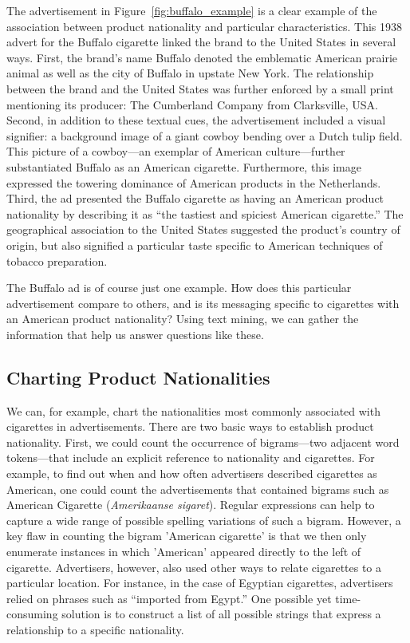 \documentclass[USenglish]{article}
\begin{document}
The advertisement in Figure~\ref{fig:buffalo_example} is a clear example of the association between product nationality and particular characteristics. This  1938 advert for the Buffalo cigarette linked the brand to the United States in several ways. First, the brand's name Buffalo denoted the emblematic American prairie animal as well as the city of Buffalo in upstate New York. The relationship between the brand and the United States was further enforced by a small print mentioning its producer: The Cumberland Company from Clarksville, USA.
%
Second, in addition to these textual cues, the advertisement included a visual signifier: a background image of a giant cowboy bending over a Dutch tulip field. This picture of a cowboy—an exemplar of American culture—further substantiated Buffalo as an American cigarette. Furthermore, this image expressed the towering dominance of American products in the Netherlands.
%
Third, the ad presented the Buffalo cigarette as having an American product nationality by describing it as ``the tastiest and spiciest American cigarette.'' The geographical association to the United States suggested the product’s country of origin, but also signified a particular taste specific to American techniques of tobacco preparation.

The Buffalo ad is of course just one example. How does this particular advertisement compare to others, and is its messaging specific to cigarettes with an American product nationality? Using text mining, we can gather the information that help us answer questions like these. 

\subsection{Charting Product Nationalities}
We can, for example, chart the nationalities most commonly associated with cigarettes in advertisements. There are two basic ways to establish product nationality. First, we could count the occurrence of bigrams---two adjacent word tokens---that include an explicit reference to nationality and cigarettes. For example, to find out when and how often advertisers described cigarettes as American, one could count the advertisements that contained bigrams such as American Cigarette (\textit{Amerikaanse sigaret}). Regular expressions can help to capture a wide range of possible spelling variations of such a bigram. However, a key flaw in counting the bigram 'American cigarette' is that we then only enumerate instances in which 'American' appeared directly to the left of cigarette. Advertisers, however, also used other ways to relate cigarettes to a particular location. For instance, in the case of Egyptian cigarettes, advertisers relied on phrases such as ``imported from Egypt.'' One possible yet time-consuming solution is to construct a list of all possible strings that express a relationship to a specific nationality. 
\end{document}
